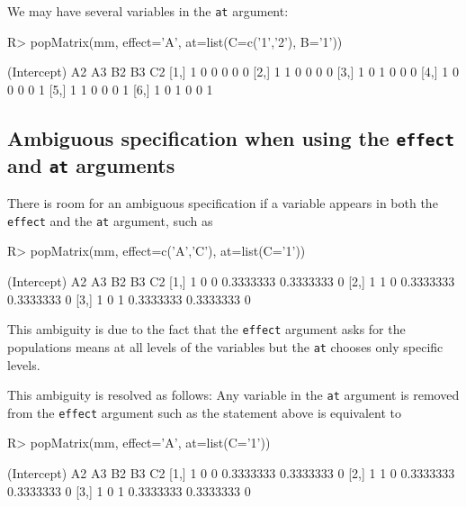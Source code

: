 \documentclass[11pt]{article}
\def\code#1{\texttt{#1}}
\begin{document}
We may have several variables in the \code{at} argument:
\begin{Schunk}
\begin{Sinput}
R> popMatrix(mm, effect='A', at=list(C=c('1','2'), B='1'))
\end{Sinput}
\begin{Soutput}
     (Intercept) A2 A3 B2 B3 C2
[1,]           1  0  0  0  0  0
[2,]           1  1  0  0  0  0
[3,]           1  0  1  0  0  0
[4,]           1  0  0  0  0  1
[5,]           1  1  0  0  0  1
[6,]           1  0  1  0  0  1
\end{Soutput}
\end{Schunk}

\subsection{Ambiguous specification when using the \texttt{effect} and
  \texttt{at} arguments}

There is room for an ambiguous specification if a variable appears in
both the \code{effect} and the \code{at} argument, such as
\begin{Schunk}
\begin{Sinput}
R> popMatrix(mm, effect=c('A','C'), at=list(C='1'))
\end{Sinput}
\begin{Soutput}
     (Intercept) A2 A3        B2        B3 C2
[1,]           1  0  0 0.3333333 0.3333333  0
[2,]           1  1  0 0.3333333 0.3333333  0
[3,]           1  0  1 0.3333333 0.3333333  0
\end{Soutput}
\end{Schunk}

This ambiguity is due to the fact that the \verb+effect+ argument asks
for the populations means at all levels of the variables but the
\verb+at+ chooses only specific levels.

This ambiguity is resolved as follows: Any variable in the \code{at}
argument is removed from the \code{effect} argument such as the
statement above is equivalent to
\begin{Schunk}
\begin{Sinput}
R> popMatrix(mm, effect='A', at=list(C='1'))
\end{Sinput}
\begin{Soutput}
     (Intercept) A2 A3        B2        B3 C2
[1,]           1  0  0 0.3333333 0.3333333  0
[2,]           1  1  0 0.3333333 0.3333333  0
[3,]           1  0  1 0.3333333 0.3333333  0
\end{Soutput}
\end{Schunk}
\end{document}
